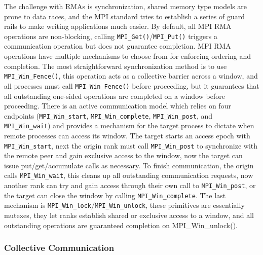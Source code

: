 The challenge with RMAs is synchronization, shared memory type models are prone to data races, and the MPI standard tries to establish a series of guard rails to make writing applications much easier.
By default, all MPI RMA operations are non-blocking, calling \texttt{MPI\_Get()}/\texttt{MPI\_Put()} triggers a communication operation but does not guarantee completion.
MPI RMA operations have multiple mechanisms to choose from for enforcing ordering and completion.
The most straightforward synchronization method is to use \texttt{MPI\_Win\_Fence()}, this operation acts as a collective barrier across a window, and all processes must call \texttt{MPI\_Win\_Fence()} before proceeding, but it guarantees that all outstanding one-sided operations are completed on a window before proceeding. 
There is an active communication model which relies on four endpoints (\texttt{MPI\_Win\_start}, \texttt{MPI\_Win\_complete}, \texttt{MPI\_Win\_post}, and \texttt{MPI\_Win\_wait}) and provides a mechanism for the target process to dictate when remote processes can access its window.
The target starts an access epoch with \texttt{MPI\_Win\_start}, next the origin rank must call \texttt{MPI\_Win\_post} to synchronize with the remote peer and gain exclusive access to the window, now the target can issue put/get/accumulate calls as necessary.
To finish communication, the origin calls \texttt{MPI\_Win\_wait}, this cleans up all outstanding communication requests, now another rank can try and gain access through their own call to \texttt{MPI\_Win\_post}, or the target can close the window by calling \texttt{MPI\_Win\_complete}.
The last mechanism is \texttt{MPI\_Win\_lock}/\texttt{MPI\_Win\_unlock}, these primitives are essentially mutexes, they let ranks establish shared or exclusive access to a window, and all outstanding operations are guaranteed completion on MPI\_Win\_unlock().

\subsubsection{Collective Communication}



